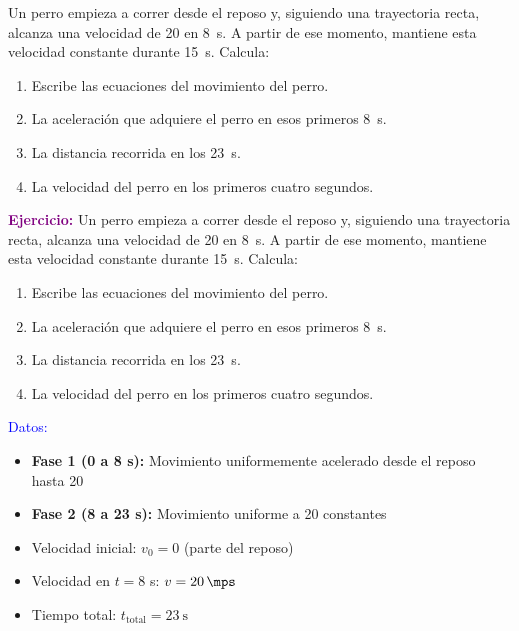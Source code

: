\begin{exercise}
    Un perro empieza a correr desde el reposo y, siguiendo una trayectoria recta, alcanza una velocidad de \qty{20}{\mps} en \qty{8}{\s}.
    A partir de ese momento, mantiene esta velocidad constante durante \qty{15}{\s}.
    Calcula:
    \begin{enumerate}[label=\letraminuscula]
    \item Escribe las ecuaciones del movimiento del perro.
    \item La aceleración que adquiere el perro en esos primeros \qty{8}{\s}.
    \item La distancia recorrida en los \qty{23}{\s}.
    \item La velocidad del perro en los primeros cuatro segundos.
    \end{enumerate}
    \begin{solu}
        \textbf{\textcolor{purple}{Ejercicio:}} Un perro empieza a correr desde el reposo y, siguiendo una trayectoria recta, alcanza una velocidad de \qty{20}{\mps} en \qty{8}{\s}.
        A partir de ese momento, mantiene esta velocidad constante durante \qty{15}{\s}.
        Calcula:
        \begin{enumerate}[label=\letraminuscula]
    \item Escribe las ecuaciones del movimiento del perro.
    \item La aceleración que adquiere el perro en esos primeros \qty{8}{\s}.
    \item La distancia recorrida en los \qty{23}{\s}.
    \item La velocidad del perro en los primeros cuatro segundos.
        \end{enumerate}

        \vspace{0.3cm}

        \textcolor{blue}{Datos:}
        \begin{itemize}
            \item \textbf{Fase 1 (0 a 8 s):} Movimiento uniformemente acelerado desde el reposo hasta \qty{20}{\mps}
            \item \textbf{Fase 2 (8 a 23 s):} Movimiento uniforme a \qty{20}{\mps} constantes
            \item Velocidad inicial: $v_0 = 0$ (parte del reposo)
            \item Velocidad en $t = 8$ s: $v = \qty{20}{\mps}$
            \item Tiempo total: $t_{\text{total}} = \qty{23}{\s}$
        \end{itemize}


\end{solu}
\end{exercise}
